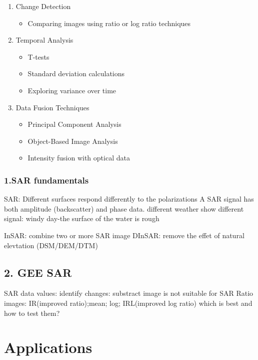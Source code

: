 \documentclass[
  letterpaper,
]{scrbook}
\providecommand{\tightlist}{%
  \setlength{\itemsep}{0pt}\setlength{\parskip}{0pt}}\usepackage{longtable,booktabs,array}
\begin{document}
\begin{enumerate}
\def\labelenumi{\arabic{enumi}.}
\item
  Change Detection

  \begin{itemize}
  \tightlist
  \item
    Comparing images using ratio or log ratio techniques
  \end{itemize}
\item
  Temporal Analysis

  \begin{itemize}
  \item
    T-tests
  \item
    Standard deviation calculations
  \item
    Exploring variance over time
  \end{itemize}
\item
  Data Fusion Techniques

  \begin{itemize}
  \item
    Principal Component Analysis
  \item
    Object-Based Image Analysis
  \item
    Intensity fusion with optical data
  \end{itemize}
\end{enumerate}

\subsubsection{1.SAR fundamentals}\label{sar-fundamentals}

SAR: Different surfaces respond differently to the polarizations A SAR
signal has both amplitude (backscatter) and phase data. different
weather show different signal: windy day-the surface of the water is
rough

InSAR: combine two or more SAR image DInSAR: remove the effet of natural
elevtation (DSM/DEM/DTM)

\subsection{2. GEE SAR}\label{gee-sar}

SAR data values: identify changes: substract image is not suitable for
SAR Ratio images: IR(improved ratio);mean; log; IRL(improved log ratio)
which is best and how to test them?

\section{Applications}\label{applications-6}
\end{document}
